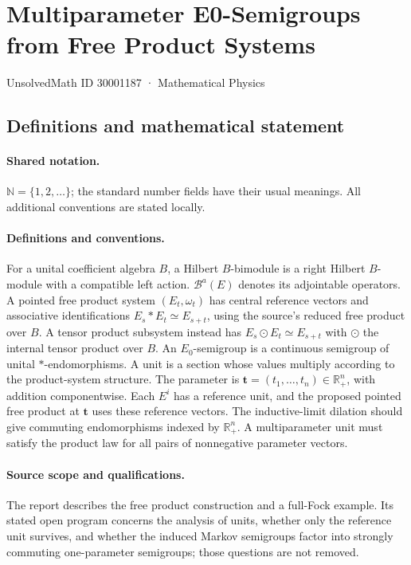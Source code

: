 \documentclass[11pt]{article}
\begin{document}
\setcounter{section}{30001186}
\section{Multiparameter E0-Semigroups from Free Product Systems}\label{30001187}
{\small UnsolvedMath ID 30001187 · Mathematical Physics}
\subsection{Definitions and mathematical statement}

\paragraph{Shared notation.}$\mathbb N=\{1,2,\ldots\}$; the standard number fields have their usual meanings. All additional conventions are stated locally.


\paragraph{Definitions and conventions.} For a unital coefficient algebra $B$, a Hilbert $B$-bimodule is a right Hilbert $B$-module with a compatible left action. $\mathcal B^a(E)$ denotes its adjointable operators. A pointed free product system $(E_t,\omega_t)$ has central reference vectors and associative identifications $E_s*E_t\simeq E_{s+t}$, using the source's reduced free product over $B$. A tensor product subsystem instead has $E_s\odot E_t\simeq E_{s+t}$ with $\odot$ the internal tensor product over $B$. An $E_0$-semigroup is a continuous semigroup of unital $*$-endomorphisms. A unit is a section whose values multiply according to the product-system structure. The parameter is $\mathbf t=(t_1,\ldots,t_n)\in\mathbb R_+^n$, with addition componentwise. Each $E^i$ has a reference unit, and the proposed pointed free product at $\mathbf t$ uses these reference vectors. The inductive-limit dilation should give commuting endomorphisms indexed by $\mathbb R_+^n$. A multiparameter unit must satisfy the product law for all pairs of nonnegative parameter vectors.

\paragraph{Source scope and qualifications.} The report describes the free product construction and a full-Fock example. Its stated open program concerns the analysis of units, whether only the reference unit survives, and whether the induced Markov semigroups factor into strongly commuting one-parameter semigroups; those questions are not removed.
\end{document}
